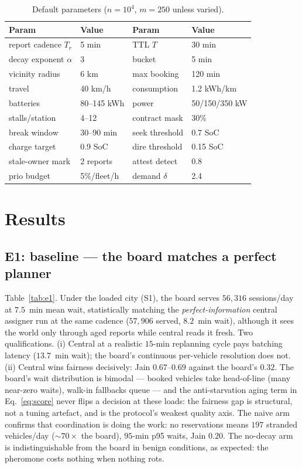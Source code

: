 \documentclass[twoside,twocolumn,usenatbib]{mnras}
\begin{document}
\begin{table}
\centering
\caption{Default parameters ($n=10^4$, $m=250$ unless varied).}
\label{tab:params}
\begin{tabular}{@{}llll@{}}
\toprule
Param & Value & Param & Value \\
\midrule
report cadence $T_r$ & 5 min & TTL $T$ & 30 min \\
decay exponent $\alpha$ & 3 & bucket & 5 min \\
vicinity radius & 6 km & max booking & 120 min \\
travel & 40 km/h & consumption & 1.2 kWh/km \\
batteries & 80--145 kWh & power & 50/150/350 kW \\
stalls/station & 4--12 & contract mask & 30\% \\
break window & 30--90 min & seek threshold & 0.7 SoC \\
charge target & 0.9 SoC & dire threshold & 0.15 SoC \\
stale-owner mark & 2 reports & attest detect & 0.8 \\
prio budget & 5\%/fleet/h & demand $\delta$ & 2.4 \\
\bottomrule
\end{tabular}
\end{table}

\section{Results}

\label{sec:results}

\subsection{E1: baseline --- the board matches a perfect planner}

Table~\ref{tab:e1}.  Under the loaded city (S1), the board serves
$56{,}316$ sessions/day at $7.5$~min mean wait, statistically
matching the \emph{perfect-information} central assigner run at the
same cadence ($57{,}906$ served, $8.2$~min wait), although it sees
the world only through aged reports while central reads it
fresh.  Two qualifications.  (i) Central at a realistic
$15$-min replanning cycle pays batching latency ($13.7$~min wait);
the board's continuous per-vehicle resolution does not.  (ii) Central
wins fairness decisively: Jain $0.67$--$0.69$ against the board's
$0.32$.  The board's wait distribution is bimodal --- booked vehicles
take head-of-line (many near-zero waits), walk-in fallbacks queue
--- and the anti-starvation aging term in Eq.~\ref{eq:score} never
flips a decision at these loads: the fairness gap is structural, not
a tuning artefact, and is the protocol's weakest quality axis.  The
naive arm confirms that coordination is doing the work: no
reservations means $197$ stranded vehicles/day ($\sim\!70\times$ the
board), $95$-min p95 waits, Jain $0.20$.  The no-decay arm is
indistinguishable from the board in benign conditions, as expected:
the pheromone costs nothing when nothing rots.
\end{document}
